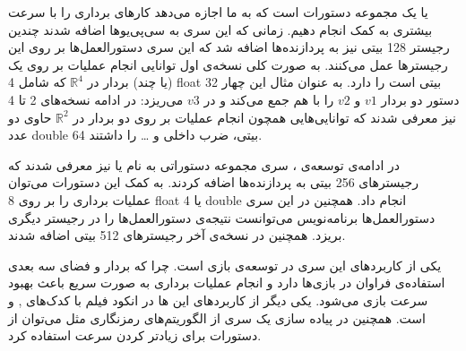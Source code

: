 
\noindent
{}
یا
یک مجموعه دستورات است که به ما اجازه می‌دهد کار‌های برداری را با سرعت بیشتری به کمک
انجام دهیم.
زمانی که این سری
به سی‌پی‌یو‌ها اضافه شدند چندین رجیستر
128
بیتی نیز به پردازنده‌ها اضافه شد که این سری دستورالعمل‌ها بر روی این رجیستر‌ها عمل می‌کنند.
به صورت کلی نسخه‌ی اول
توانایی انجام عملیات بر روی یک (یا چند) بردار در
$\mathbb{R}^4$
که شامل 4
float
32 بیتی
است را دارد.
به عنوان مثال این چهار دستور دو بردار
$v1$ و $v2$
را با هم جمع می‌کند و در
$v3$
می‌ریزد:
\noindent
در ادامه نسخه‌های 2 تا 4
نیز معرفی شدند که توانایی‌هایی همچون انجام عملیات بر روی دو بردار در
$\mathbb{R}^2$
حاوی دو عدد
double
64 بیتی،
ضرب داخلی و
\dots
را داشتند.

\noindent
در ادامه‌ی توسعه‌ی
،
سری مجموعه ‌دستوراتی به نام
 یا 
نیز معرفی شدند که رجیستر‌های 256 بیتی به پردازنده‌ها اضافه کردند.
به کمک این دستورات می‌توان عملیات برداری را بر روی
8 float
یا
4 double
انجام داد.
همچنین در این سری دستورالعمل‌ها برنامه‌نویس می‌توانست نتیجه‌ی دستورالعمل‌ها را در رجیستر دیگری بریزد.
همچنین در نسخه‌ی آخر
رجیستر‌های 512 بیتی اضافه شدند.

\noindent
یکی از کاربرد‌های این سری
در توسعه‌ی بازی است. چرا که بردار و فضای سه بعدی استفاده‌ی فراوان در بازی‌ها دارد و انجام عملیات برداری
به صورت سریع باعث بهبود سرعت بازی می‌شود.
یکی دیگر از کاربرد‌های این
ها
در انکود فیلم با کدک‌های
,  و 
است.
همچنین در پیاده سازی یک سری از الگوریتم‌های رمزنگاری مثل
می‌توان از دستورات
برای زیادتر کردن سرعت استفاده کرد.